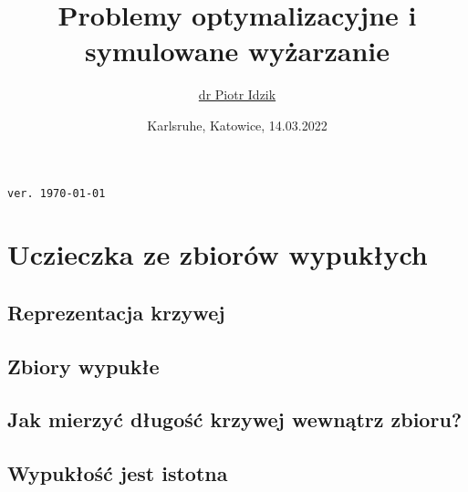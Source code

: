 \documentclass[aspectratio=169]{beamer}
\author{\texorpdfstring{\href{\myLinkedinLink}{dr Piotr Idzik} \\ \email{\myEmail}}{Piotr Idzik}}
\title{Problemy optymalizacyjne i symulowane wyżarzanie}
\date{Karlsruhe, Katowice, 14.03.2022}
\newcommand{\myLinkedinLink}{https://www.linkedin.com/in/piotr-idzik-34b572151/}
\newcommand{\myGithubLink}{https://github.com/vil02/}
\newcommand{\myLinkedin}{\href{\myLinkedinLink}{\faLinkedinSquare}}
\newcommand{\myGithub}{\href{\myGithubLink}{\faGithubSquare}}
\begin{document}
\begin{frame}[plain]
\maketitle

\myLinkedin{}
\myGithub{}
\hfill \textcolor[rgb]{0.85,0.85,0.85}{\texttt{\tiny{ver. \today\ \currenttime\/}}}
\end{frame}

\section{Uczieczka ze zbiorów wypukłych}
\subsection{Reprezentacja krzywej}
{\curveRepresentationExampleTex}
\subsection{Zbiory wypukłe}
{\convexExamplesTex}
\subsection{Jak mierzyć długość krzywej wewnątrz zbioru?}
{\lengthInsideExampleTex}
\subsection{Wypukłość jest istotna}
{\lengthInsideExampleNonconvexTex}

\begin{frame}
  \begin{figure}
    	{\escapeFromCircleTex}
  \end{figure}
\end{frame}

\begin{frame}
  \begin{figure}
    	{\escapeFromCircleFixedTex}
  \end{figure}
\end{frame}


\begin{frame}
  \begin{figure}
    	{\escapeFromRectangleTex}
  \end{figure}
\end{frame}
\end{document}
